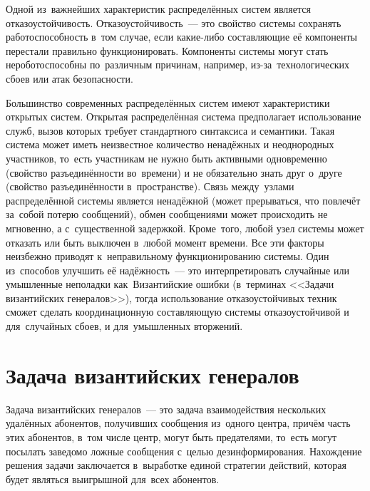 Одной из~важнейших характеристик распределённых систем является отказоустойчивость. Отказоустойчивость~--- это свойство системы сохранять работоспособность в~том случае, если какие-либо составляющие её компоненты перестали правильно функционировать. Компоненты системы могут стать нероботоспособны по~различным причинам, например, из-за~технологических сбоев или атак безопасности.

Большинство современных распределённых систем имеют характеристики открытых систем. Открытая распределённая система предполагает использование служб, вызов которых требует стандартного синтаксиса и семантики. Такая система может иметь неизвестное количество ненадёжных и неоднородных участников, то~есть участникам не нужно быть активными одновременно (свойство разъединённости во~времени) и не обязательно знать друг о~друге (свойство разъединённости в~пространстве). Связь между~узлами распределённой системы является ненадёжной (может прерываться, что повлечёт за~собой потерю сообщений), обмен сообщениями может происходить не мгновенно, а с~существенной задержкой. Кроме~того, любой узел системы может отказать или быть выключен в~любой момент времени. Все эти факторы неизбежно приводят к~неправильному функционированию системы. Один из~способов улучшить её надёжность~--- это интерпретировать случайные или умышленные неполадки как~Византийские ошибки (в~терминах <<Задачи византийских генералов>>), тогда использование отказоустойчивых техник сможет сделать координационную составляющую системы отказоустойчивой и для~случайных сбоев, и для~умышленных вторжений.

\section{Задача византийских генералов}\label{sec:2}
Задача византийских генералов~--- это задача взаимодействия нескольких удалённых абонентов, получивших сообщения из~одного центра, причём часть этих абонентов, в~том числе центр, могут быть предателями, то~есть могут посылать заведомо ложные сообщения с~целью дезинформирования. Нахождение решения задачи заключается в~выработке единой стратегии действий, которая будет являться выигрышной для~всех абонентов.

